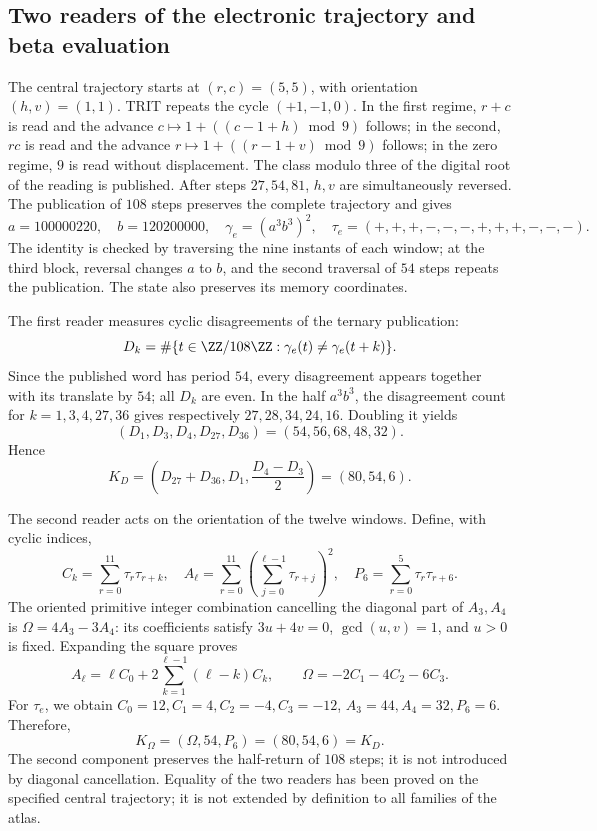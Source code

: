 \subsection{Two readers of the electronic trajectory and beta evaluation}
\label{vi:dep:beta}

The central trajectory starts at \((r,c)=(5,5)\), with
orientation \((h,v)=(1,1)\). TRIT repeats the cycle \((+1,-1,0)\).
In the first regime, \(r+c\) is read and the advance
\(c\mapsto1+((c-1+h)\bmod9)\) follows; in the second, \(rc\) is read and
the advance \(r\mapsto1+((r-1+v)\bmod9)\) follows; in the zero
regime, \(9\) is read without displacement. The class modulo
three of the digital root of the reading is published. After steps \(27,54,81\),
\(h,v\) are simultaneously reversed. The publication of \(108\)
steps preserves the complete trajectory and gives
\begin{equation}
 a=100000220,\quad b=120200000,\quad
 \gamma_e=(a^3b^3)^2,
 \quad\tau_e=(+,+,+,-,-,-,+,+,+,-,-,-).
 \label{vi:dep:trayectoria-electron}
\end{equation}
The identity is checked by traversing the nine instants of each
window; at the third block, reversal changes \(a\) to \(b\),
and the second traversal of \(54\) steps repeats the publication.
The state also preserves its memory coordinates.

The first reader measures cyclic disagreements of the ternary publication:
\[
 D_k=\#\{t\in\ZZ/108\ZZ:\gamma_e(t)\ne\gamma_e(t+k)\}.
\]
Since the published word has period \(54\), every disagreement
appears together with its translate by \(54\); all \(D_k\) are even.
In the half \(a^3b^3\), the disagreement count for
\(k=1,3,4,27,36\) gives respectively \(27,28,34,24,16\).
Doubling it yields
\[
 (D_1,D_3,D_4,D_{27},D_{36})=(54,56,68,48,32).
\]
Hence
\begin{equation}
 K_D=\left(D_{27}+D_{36},D_1,\frac{D_4-D_3}{2}\right)
     =(80,54,6).
 \label{vi:dep:KD}
\end{equation}

The second reader acts on the orientation of the twelve windows.
Define, with cyclic indices,
\[
 C_k=\sum_{r=0}^{11}\tau_r\tau_{r+k},\quad
 A_\ell=\sum_{r=0}^{11}\left(\sum_{j=0}^{\ell-1}\tau_{r+j}\right)^2,
 \quad P_6=\sum_{r=0}^{5}\tau_r\tau_{r+6}.
\]
The oriented primitive integer combination cancelling the diagonal part
of \(A_3,A_4\) is \(\Omega=4A_3-3A_4\): its coefficients
satisfy \(3u+4v=0\), \(\gcd(u,v)=1\), and \(u>0\) is fixed.
Expanding the square proves
\[
 A_\ell=\ell C_0+
     2\sum_{k=1}^{\ell-1}(\ell-k)C_k,
 \qquad\Omega=-2C_1-4C_2-6C_3.
\]
For \(\tau_e\), we obtain
\(C_0=12,C_1=4,C_2=-4,C_3=-12\),
\(A_3=44,A_4=32,P_6=6\). Therefore,
\begin{equation}
 K_\Omega=(\Omega,54,P_6)=(80,54,6)=K_D.
 \label{vi:dep:KOmega}
\end{equation}
The second component preserves the half-return of \(108\) steps;
it is not introduced by diagonal cancellation. Equality of the two
readers has been proved on the specified central trajectory;
it is not extended by definition to all families of the atlas.

